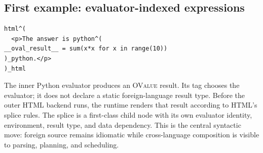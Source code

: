 \documentclass[11pt,oneside]{article}
\newcommand{\ovalue}{{\mdseries\textsc{OValue}}}
\begin{document}
\subsection{First example: evaluator-indexed expressions}

\begin{lstlisting}[style=ostyle]
html^(
  <p>The answer is python^(
__oval_result__ = sum(x*x for x in range(10))
)_python.</p>
)_html
\end{lstlisting}

The inner Python evaluator produces an \ovalue{} result. Its tag chooses the
evaluator; it does not declare a static foreign-language result type. Before the outer HTML
backend runs, the runtime renders that result according to HTML's splice
rules. The splice is a first-class child node with its own evaluator identity,
environment, result type, and data dependency. This is the central syntactic
move: foreign source remains idiomatic while cross-language composition is
visible to parsing, planning, and scheduling.
\end{document}
